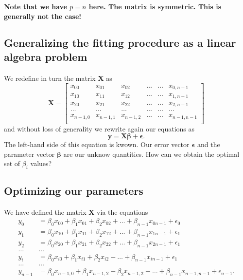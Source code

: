 \documentclass[%
oneside,                 %
final,                   %
10pt]{article}
\begin{document}
\textbf{Note that we have $p=n$ here. The matrix is symmetric. This is generally not the case!}




\subsection{Generalizing the fitting procedure as a linear algebra problem}

\paragraph{}
We redefine in turn the matrix $\bm{X}$ as
\[
\bm{X}=
\begin{bmatrix} 
x_{00}& x_{01} &x_{02}& \dots & \dots &x_{0,n-1}\\
x_{10}& x_{11} &x_{12}& \dots & \dots &x_{1,n-1}\\
x_{20}& x_{21} &x_{22}& \dots & \dots &x_{2,n-1}\\                      
\dots& \dots &\dots& \dots & \dots &\dots\\
x_{n-1,0}& x_{n-1,1} &x_{n-1,2}& \dots & \dots &x_{n-1,n-1}\\
\end{bmatrix} 
\]
and without loss of generality we rewrite again  our equations as
\[
\bm{y} = \bm{X}\bm{\beta}+\bm{\epsilon}.
\]
The left-hand side of this equation is kwown. Our error vector $\bm{\epsilon}$ and the parameter vector $\bm{\beta}$ are our unknow quantities. How can we obtain the optimal set of $\beta_i$ values?




\subsection{Optimizing our parameters}

\paragraph{}
We have defined the matrix $\bm{X}$ via the equations
\begin{align*}
y_0&=\beta_0x_{00}+\beta_1x_{01}+\beta_2x_{02}+\dots+\beta_{n-1}x_{0n-1}+\epsilon_0\\
y_1&=\beta_0x_{10}+\beta_1x_{11}+\beta_2x_{12}+\dots+\beta_{n-1}x_{1n-1}+\epsilon_1\\
y_2&=\beta_0x_{20}+\beta_1x_{21}+\beta_2x_{22}+\dots+\beta_{n-1}x_{2n-1}+\epsilon_1\\
\dots & \dots \\
y_{i}&=\beta_0x_{i0}+\beta_1x_{i1}+\beta_2x_{i2}+\dots+\beta_{n-1}x_{in-1}+\epsilon_1\\
\dots & \dots \\
y_{n-1}&=\beta_0x_{n-1,0}+\beta_1x_{n-1,2}+\beta_2x_{n-1,2}+\dots+\beta_{n-1}x_{n-1,n-1}+\epsilon_{n-1}.\\
\end{align*}
\end{document}

